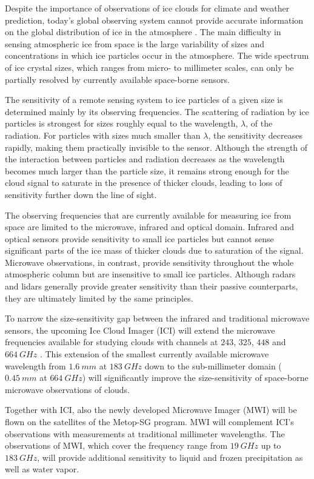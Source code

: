 \documentclass[journal abbreviation, manuscript]{copernicus}
\begin{document}
Despite the importance of observations of ice clouds for climate and weather
prediction, today's global observing system cannot provide accurate information
on the global distribution of ice in the atmosphere
\citep{eliasson11,duncan18a}. The main difficulty in sensing atmospheric ice
from space is the large variability of sizes and concentrations in which ice
particles occur in the atmosphere. The wide spectrum of ice crystal sizes, which
ranges from micro- to millimeter scales, can only be partially resolved by
currently available space-borne sensors.

The sensitivity of a remote sensing system to ice particles of a given size is
determined mainly by its observing frequencies. The scattering of radiation by
ice particles is strongest for sizes roughly equal to the wavelength, $\lambda$,
of the radiation. For particles with sizes much smaller than $\lambda$, the
sensitivity decreases rapidly, making them practically invisible to the sensor.
Although the strength of the interaction between particles and radiation
decreases as the wavelength becomes much larger than the particle size, it
remains strong enough for the cloud signal to saturate in the presence of
thicker clouds, leading to loss of sensitivity further down the line of sight.

The observing frequencies that are currently available for measuring ice from
space are limited to the microwave, infrared and optical domain. Infrared and
optical sensors provide sensitivity to small ice particles but cannot sense
significant parts of the ice mass of thicker clouds due to saturation of the
signal. Microwave observations, in contrast, provide sensitivity throughout the
whole atmospheric column but are insensitive to small ice particles. Although
radars and lidars generally provide greater sensitivity than their passive
counterparts, they are ultimately limited by the same principles.

To narrow the size-sensitivity gap between the infrared and traditional microwave
sensors, the upcoming Ice Cloud Imager (ICI) will extend the microwave
frequencies available for studying clouds with channels at $243$, $325$, $448$ and
$664\ \unit{GHz}$ \citep{Eriksson19}. This extension of the smallest currently available microwave
wavelength from $1.6\ \unit{mm}$ at $183\ \unit{GHz}$ down to the sub-millimeter
domain ($0.45\ \unit{mm}$ at $664\ \unit{GHz}$) will significantly improve the
size-sensitivity of space-borne microwave observations of clouds.

Together with ICI, also the newly developed Microwave Imager (MWI) will be
flown on the satellites of the Metop-SG program. MWI will complement ICI's
observations with measurements at traditional millimeter wavelengths. The observations
of MWI, which cover the frequency range from $19\ \unit{GHz}$ up to
$183\ \unit{GHz}$, will provide additional sensitivity to liquid and frozen
precipitation as well as water vapor.
\end{document}
